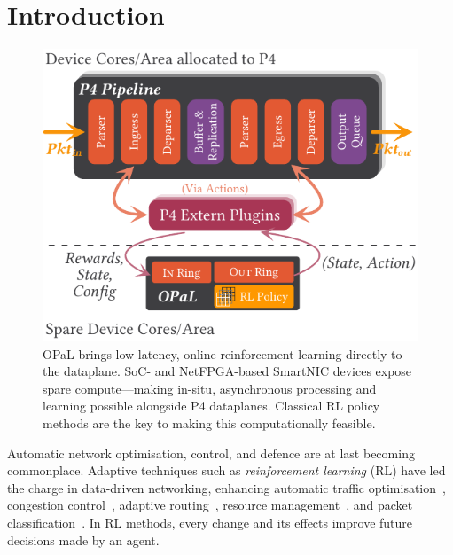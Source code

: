 \documentclass[
conference
,10pt
]{IEEEtran}
\newcommand{\approachshort}{OPaL}
\begin{document}


\section{Introduction}
\begin{figure}
	\centering
	\includegraphics[keepaspectratio, width=0.6875\linewidth]{figures/arch-with-p4}
	\caption{\approachshort{} brings low-latency, online reinforcement learning directly to the dataplane. SoC- and NetFPGA-based SmartNIC devices expose spare compute---making in-situ, asynchronous processing and learning possible alongside P4 dataplanes. Classical RL policy methods are the key to making this computationally feasible.\label{fig:netro-arch}}
\end{figure}
Automatic network optimisation, control, and defence are at last becoming commonplace.
Adaptive techniques such as \emph{reinforcement learning} (RL) have led the charge in data-driven networking, enhancing automatic traffic optimisation~\parencite{DBLP:conf/sigcomm/ChenL0L18,DBLP:conf/sigcomm/MaoNA17}, congestion control~\parencite{DBLP:journals/corr/abs-1910-04054}, adaptive routing~\parencite{DBLP:conf/hotnets/ValadarskySST17,DBLP:conf/conext/GiladSGRS20}, resource management~\parencite{DBLP:conf/hotnets/MaoAMK16}, and packet classification~\parencite{DBLP:conf/sigcomm/LiangZJS19}.
In RL methods, every change and its effects improve future decisions made by an agent.
\end{document}
